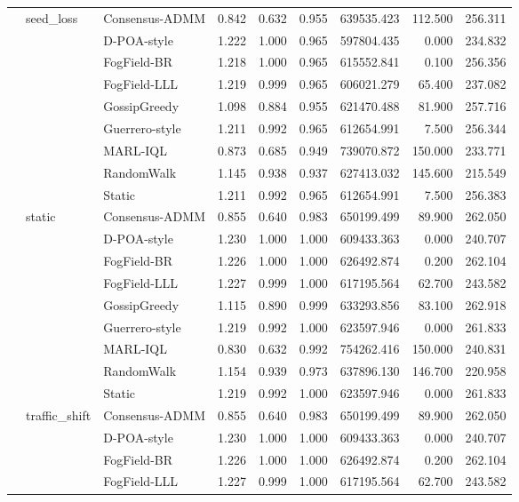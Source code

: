 \begin{table}
\begin{tabular}{lllrrrrrr}
\cline{2-9}
 & \multirow[t]{9}{*}{seed\_loss} & Consensus-ADMM & 0.842 & 0.632 & 0.955 & 639535.423 & 112.500 & 256.311 \\
 &  & D-POA-style & 1.222 & 1.000 & 0.965 & 597804.435 & 0.000 & 234.832 \\
 &  & FogField-BR & 1.218 & 1.000 & 0.965 & 615552.841 & 0.100 & 256.356 \\
 &  & FogField-LLL & 1.219 & 0.999 & 0.965 & 606021.279 & 65.400 & 237.082 \\
 &  & GossipGreedy & 1.098 & 0.884 & 0.955 & 621470.488 & 81.900 & 257.716 \\
 &  & Guerrero-style & 1.211 & 0.992 & 0.965 & 612654.991 & 7.500 & 256.344 \\
 &  & MARL-IQL & 0.873 & 0.685 & 0.949 & 739070.872 & 150.000 & 233.771 \\
 &  & RandomWalk & 1.145 & 0.938 & 0.937 & 627413.032 & 145.600 & 215.549 \\
 &  & Static & 1.211 & 0.992 & 0.965 & 612654.991 & 7.500 & 256.383 \\
\cline{2-9}
 & \multirow[t]{9}{*}{static} & Consensus-ADMM & 0.855 & 0.640 & 0.983 & 650199.499 & 89.900 & 262.050 \\
 &  & D-POA-style & 1.230 & 1.000 & 1.000 & 609433.363 & 0.000 & 240.707 \\
 &  & FogField-BR & 1.226 & 1.000 & 1.000 & 626492.874 & 0.200 & 262.104 \\
 &  & FogField-LLL & 1.227 & 0.999 & 1.000 & 617195.564 & 62.700 & 243.582 \\
 &  & GossipGreedy & 1.115 & 0.890 & 0.999 & 633293.856 & 83.100 & 262.918 \\
 &  & Guerrero-style & 1.219 & 0.992 & 1.000 & 623597.946 & 0.000 & 261.833 \\
 &  & MARL-IQL & 0.830 & 0.632 & 0.992 & 754262.416 & 150.000 & 240.831 \\
 &  & RandomWalk & 1.154 & 0.939 & 0.973 & 637896.130 & 146.700 & 220.958 \\
 &  & Static & 1.219 & 0.992 & 1.000 & 623597.946 & 0.000 & 261.833 \\
\cline{2-9}
 & \multirow[t]{9}{*}{traffic\_shift} & Consensus-ADMM & 0.855 & 0.640 & 0.983 & 650199.499 & 89.900 & 262.050 \\
 &  & D-POA-style & 1.230 & 1.000 & 1.000 & 609433.363 & 0.000 & 240.707 \\
 &  & FogField-BR & 1.226 & 1.000 & 1.000 & 626492.874 & 0.200 & 262.104 \\
 &  & FogField-LLL & 1.227 & 0.999 & 1.000 & 617195.564 & 62.700 & 243.582 \\

\end{tabular}
\end{table}
